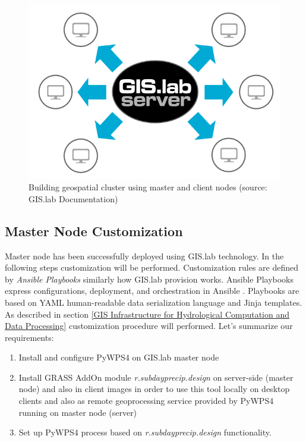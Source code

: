 \documentclass{isprs}
\begin{document}
\begin{figure}[ht!]
\begin{center}
  \includegraphics[width=1.0\columnwidth]{figures/gislab-machines-launch.png}
  \caption{Building geospatial cluster using master and client nodes
    (source: GIS.lab Documentation)}
\label{fig:gislab_infrastructure}
\end{center}
\end{figure}

\subsection{Master Node Customization}

Master node has been successfully deployed using GIS.lab
technology. In the following steps customization will be
performed. Customization rules are defined by \textit{Ansible
  Playbooks} similarly how GIS.lab provision works. Ansible Playbooks
express configurations, deployment, and orchestration in Ansible
\cite{shah2015ansible}. Playbooks are based on YAML human-readable
data serialization language and Jinja templates. As described in
section \ref{GIS Infrastructure for Hydrological Computation and
  Data Processing} customization procedure will performed. Let's summarize
our requirements:

\begin{enumerate}
\setlength\itemsep{0em}\setlength\parskip{0em}\setlength\topsep{0em}\setlength\partopsep{0em}\setlength\parsep{0em}
\item{Install and configure PyWPS4 on GIS.lab master node}
\item{Install GRASS AddOn module \textit{r.subdayprecip.design} on
    server-side (master node) and also in client images in order to
    use this tool locally on desktop clients and also as remote
    geoprocessing service provided by PyWPS4 running on master node
    (server)}
\item{Set up PyWPS4 process based on \textit{r.subdayprecip.design}
  functionality.}
\end{enumerate}
\end{document}

